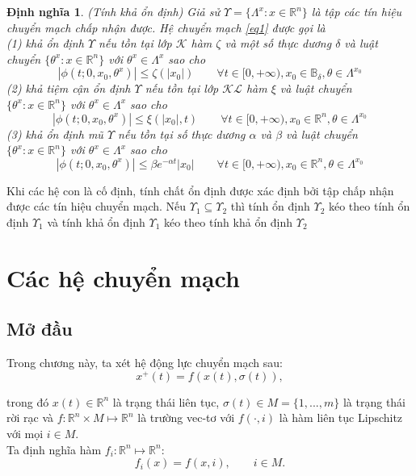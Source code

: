\documentclass[14pt,a4paper,oneside]{report}		%
\newtheorem{define}[theorem]{Định nghĩa}
\begin{document}
\begin{define} (Tính khả ổn định) Giả sử $\Upsilon = \{\Lambda^x:x\in\mathbb{R}^n\}$ là tập các tín hiệu chuyển mạch chấp nhận được. Hệ chuyển mạch \ref{eq1} được gọi là \\
(1) khả ổn định $\Upsilon$ nếu tồn tại lớp $\mathcal{K}$ hàm $\zeta$ và một số thực dương $\delta$ và luật chuyển $\{\theta^x:x\in\mathbb{R}^n\}$ với $\theta^x\in\Lambda^x$ sao cho
$$|\phi(t;0,x_0,\theta^x)|\leq\zeta(|x_0|)\qquad\forall t \in [0,+\infty ), x_0 \in\mathbb{B}_\delta , \theta \in\Lambda^{x_0}$$
(2) khả tiệm cận ổn định $\Upsilon$ nếu tồn tại lớp $\mathcal{KL}$ hàm $\xi$ và luật chuyển $\{\theta^x:x\in\mathbb{R}^n\}$ với $\theta^x\in\Lambda^x$ sao cho
$$|\phi(t;0,x_0,\theta^x)|\leq\xi(|x_0|,t)\qquad\forall t \in [0,+\infty ), x_0 \in\mathbb{R}^n , \theta \in\Lambda^{x_0}$$
(3) khả ổn định mũ $\Upsilon$ nếu tồn tại số thực dương $\alpha$ và $\beta$ và luật chuyển $\{\theta^x:x\in\mathbb{R}^n\}$ với $\theta^x\in\Lambda^x$ sao cho
$$|\phi(t;0,x_0,\theta^x)|\leq \beta e^{-\alpha t}|x_0|\qquad\forall t \in [0,+\infty ), x_0 \in\mathbb{R}^n , \theta \in\Lambda^{x_0}$$
\end{define}

Khi các hệ con là cố định, tính chất ổn định được xác định bởi tập chấp nhận được các tín hiệu chuyển mạch. Nếu $\Upsilon_1\subseteq\Upsilon_2$ thì tính ổn định $\Upsilon_2$ kéo theo tính ổn định $\Upsilon_1$ và tính khả ổn định $\Upsilon_1$ kéo theo tính khả ổn định $\Upsilon_2$

\chapter{Các hệ chuyển mạch}
\section{Mở đầu}
Trong chương này, ta xét hệ động lực chuyển mạch sau:
\begin{equation} \label{eq2-1}
x^+(t)=f(x(t),\sigma (t)),
\end{equation}

trong đó $x(t)\in\mathbb{R}^n$ là trạng thái liên tục, $\sigma (t)\in M = \{1,...,m\}$ là trạng thái rời rạc và $f : \mathbb{R}^n \times M \mapsto \mathbb{R}^n$ là trường vec-tơ với $f(\cdot ,i)$ là hàm liên tục Lipschitz với mọi $i\in M$.\\

Ta định nghĩa hàm $f_i : \mathbb{R}^n \mapsto \mathbb{R}^n$:
$$f_i(x)=f(x,i), \qquad i\in M.$$
\end{document}
